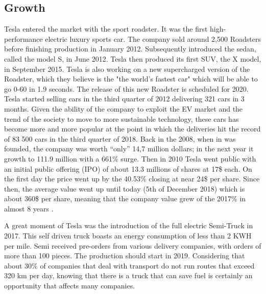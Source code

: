 
\subsection{Growth}
Tesla entered the market with the sport roadster. It was the first high-performance electric luxury sports car. The company sold around 2,500 Roadsters before finishing production in January 2012.
Subsequently introduced the sedan, called the model S, in June 2012. Tesla then produced its first SUV, the X model, in September 2015. Tesla is also working on a new supercharged version of the Roadster, which they believe is the "the world's fastest car" which will be able to go 0-60 in 1.9 seconds. The release of this new Roadster is scheduled for 2020.
Tesla started selling cars in the third quarter of 2012 delivering 321 cars in 3 months. Given the ability of the company to exploit the EV market and the trend of the society to move to more sustainable technology, these cars has become more and more popular at the point in which the deliveries hit the record of 83 500 cars in the third quarter of 2018.
Back in the 2008, when in was founded, the company was worth “only” 14,7 million dollars; in the next year it growth to 111.9 million with a 661\% surge. Then in 2010 Tesla went public with an initial public offering (IPO) of about 13.3 millions of shares at 17\$ each. On the first day the price went up by the 40.53\% closing at near 24\$ per share. Since then, the average value went up until today (5th of December 2018) which is about 360\$ per share, meaning that the company value grew of the 2017\% in almost 8 years \cite{Growth}.

A great moment of Tesla was the introduction of the full electric Semi-Truck in 2017. This self driven truck boasts an energy consumption of less than 2 KWH per mile. Semi received pre-orders from various delivery companies, with orders of more than 100 pieces. The production should start in 2019. Considering that about 30\% of companies that deal with transport do not run routes that exceed 320 km per day, knowing that there is a truck that can save fuel is certainly an opportunity that affects many companies.

